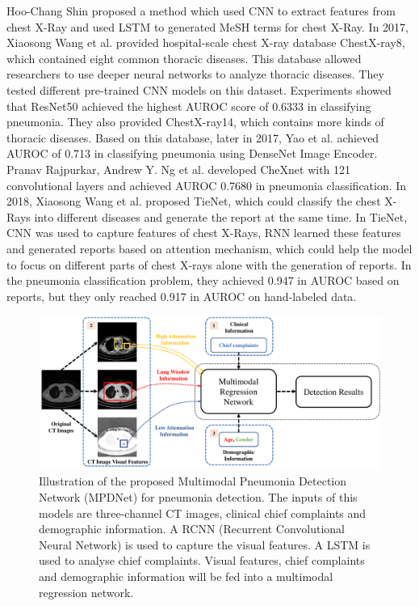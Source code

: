 \documentclass[journal]{IEEEtran}
\begin{document}
Hoo-Chang Shin \cite{Shin2016Learning} proposed a method which used CNN to extract features from chest X-Ray and used LSTM \cite{hochreiter1997long} to generated MeSH \cite{timmurphy.org} terms for chest X-Ray. In 2017, Xiaosong Wang et al. \cite{Wang2017ChestX} provided hospital-scale chest X-ray database ChestX-ray8, which contained eight common thoracic diseases. This database allowed researchers to use deeper neural networks to analyze thoracic diseases. They tested different pre-trained CNN models on this dataset. Experiments showed that ResNet50 achieved the highest AUROC score of 0.6333 in classifying pneumonia. They also provided ChestX-ray14, which contains more kinds of thoracic diseases.
Based on this database, later in 2017, Yao et al. \cite{yao2017learning} achieved AUROC of 0.713 in classifying pneumonia using DenseNet Image Encoder. Pranav Rajpurkar, Andrew Y. Ng et al. \cite{Rajpurkar2017CheXNet} developed CheXnet with 121 convolutional layers and achieved AUROC 0.7680 in pneumonia classification.
In 2018, Xiaosong Wang et al. \cite{Wang2018TieNet} proposed TieNet, which could classify the chest X-Rays into different diseases and generate the report at the same time. In TieNet, CNN was used to capture features of chest X-Rays, RNN learned these features and generated reports based on attention mechanism, which could help the model to focus on different parts of chest X-rays alone with the generation of reports. In the pneumonia classification problem, they achieved 0.947 in AUROC based on reports, but they only reached 0.917 in AUROC on hand-labeled data. 
\begin{figure}[htbp]
    \centerline{\includegraphics[width=140mm]{new1.pdf}}
    \vspace{-0cm}
    \caption{Illustration of the proposed Multimodal Pneumonia Detection Network (MPDNet) for pneumonia detection.
    The inputs of this models are three-channel CT images, clinical chief complaints and demographic information. A RCNN (Recurrent Convolutional Neural Network) is used to capture the visual features. A LSTM is used to analyse chief complaints. Visual features, chief complaints and demographic information will be fed into a multimodal regression network.}
    \vspace{-0cm}
    \label{Illustration}

    \end{figure}
    
\end{document}
